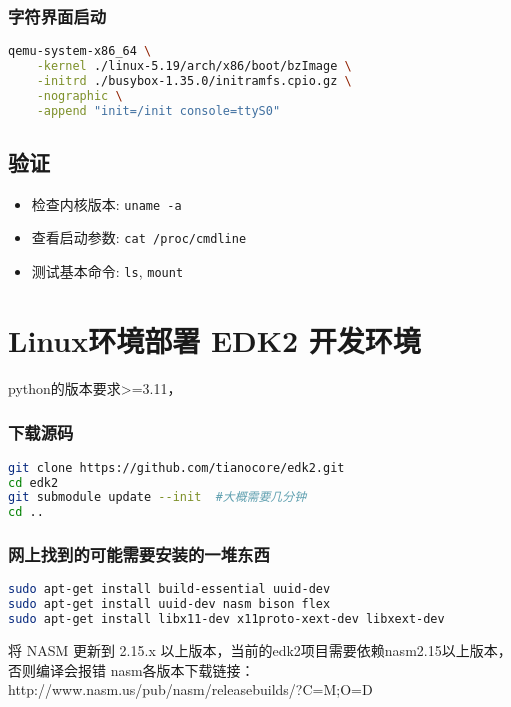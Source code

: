 \subsubsection{字符界面启动}
\begin{lstlisting}[language=bash]
qemu-system-x86_64 \
    -kernel ./linux-5.19/arch/x86/boot/bzImage \
    -initrd ./busybox-1.35.0/initramfs.cpio.gz \
    -nographic \
    -append "init=/init console=ttyS0"
\end{lstlisting}

\subsection{验证}
\begin{itemize}
    \item 检查内核版本: \texttt{uname -a}
    \item 查看启动参数: \texttt{cat /proc/cmdline}
    \item 测试基本命令: \texttt{ls}, \texttt{mount}
\end{itemize}

\section{Linux环境部署 EDK2 开发环境}

python的版本要求>=3.11，

\subsubsection{下载源码}
\begin{lstlisting}[language=bash]
git clone https://github.com/tianocore/edk2.git
cd edk2
git submodule update --init  #大概需要几分钟
cd ..
\end{lstlisting}

\subsubsection{网上找到的可能需要安装的一堆东西}
\begin{lstlisting}[language=bash]
sudo apt-get install build-essential uuid-dev
sudo apt-get install uuid-dev nasm bison flex
sudo apt-get install libx11-dev x11proto-xext-dev libxext-dev
\end{lstlisting}

将 NASM 更新到 2.15.x 以上版本，当前的edk2项目需要依赖nasm2.15以上版本，否则编译会报错
nasm各版本下载链接：http://www.nasm.us/pub/nasm/releasebuilds/?C=M;O=D

